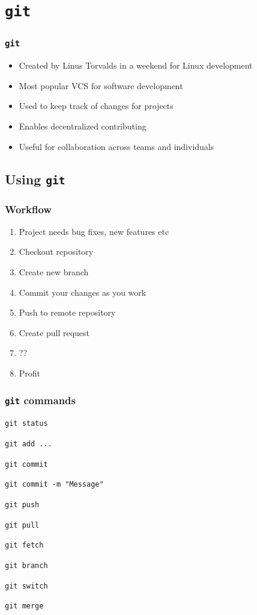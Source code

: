 \documentclass[presentation]{beamer}
\begin{document}
  \section{\texttt{git}}
  \begin{frame}
    \frametitle{\texttt{git}}
 
    \begin{itemize}
      \item Created by Linus Torvalds in a weekend for Linux development
      \item Most popular VCS for software development
      \item Used to keep track of changes for projects
      \item Enables decentralized contributing
      \item Useful for collaboration across teams and individuals
    \end{itemize}
  \end{frame}

  \subsection{Using \texttt{git}}
  \begin{frame}
    \frametitle{Workflow}
    
    \begin{enumerate}
      \item Project needs bug fixes, new features etc
      \item Checkout repository
      \item Create new branch
      \item Commit your changes as you work
      \item Push to remote repository
      \item Create pull request
      \item ??
      \item Profit
    \end{enumerate}
  \end{frame}
  \begin{frame}
    \frametitle{\texttt{git} commands}

    \begin{description}
      \item \texttt{git status}
      \item \texttt{git add ...}
      \item \texttt{git commit}
      \item \texttt{git commit -m "Message"}    
      \item \texttt{git push}
      \item \texttt{git pull}
      \item \texttt{git fetch}
      \item \texttt{git branch}
      \item \texttt{git switch}
      \item \texttt{git merge}
    \end{description}
  \end{frame}
\end{document}
